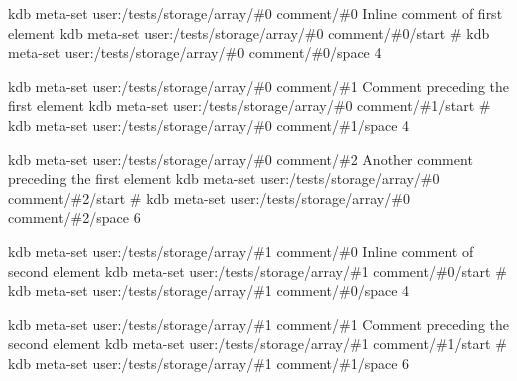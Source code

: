 kdb meta-\/set \textquotesingle{}user\+:/tests/storage/array/\#0\textquotesingle{} \textquotesingle{}comment/\#0\textquotesingle{} \textquotesingle{} Inline comment of first element\textquotesingle{} kdb meta-\/set \textquotesingle{}user\+:/tests/storage/array/\#0\textquotesingle{} \textquotesingle{}comment/\#0/start\textquotesingle{} \textquotesingle{}\#\textquotesingle{} kdb meta-\/set \textquotesingle{}user\+:/tests/storage/array/\#0\textquotesingle{} \textquotesingle{}comment/\#0/space\textquotesingle{} \textquotesingle{}4\textquotesingle{}

kdb meta-\/set \textquotesingle{}user\+:/tests/storage/array/\#0\textquotesingle{} \textquotesingle{}comment/\#1\textquotesingle{} \textquotesingle{} Comment preceding the first element\textquotesingle{} kdb meta-\/set \textquotesingle{}user\+:/tests/storage/array/\#0\textquotesingle{} \textquotesingle{}comment/\#1/start\textquotesingle{} \textquotesingle{}\#\textquotesingle{} kdb meta-\/set \textquotesingle{}user\+:/tests/storage/array/\#0\textquotesingle{} \textquotesingle{}comment/\#1/space\textquotesingle{} \textquotesingle{}4\textquotesingle{}

kdb meta-\/set \textquotesingle{}user\+:/tests/storage/array/\#0\textquotesingle{} \textquotesingle{}comment/\#2\textquotesingle{} \textquotesingle{} Another comment preceding the first element\textquotesingle{} kdb meta-\/set \textquotesingle{}user\+:/tests/storage/array/\#0\textquotesingle{} \textquotesingle{}comment/\#2/start\textquotesingle{} \textquotesingle{}\#\textquotesingle{} kdb meta-\/set \textquotesingle{}user\+:/tests/storage/array/\#0\textquotesingle{} \textquotesingle{}comment/\#2/space\textquotesingle{} \textquotesingle{}6\textquotesingle{}

kdb meta-\/set \textquotesingle{}user\+:/tests/storage/array/\#1\textquotesingle{} \textquotesingle{}comment/\#0\textquotesingle{} \textquotesingle{} Inline comment of second element\textquotesingle{} kdb meta-\/set \textquotesingle{}user\+:/tests/storage/array/\#1\textquotesingle{} \textquotesingle{}comment/\#0/start\textquotesingle{} \textquotesingle{}\#\textquotesingle{} kdb meta-\/set \textquotesingle{}user\+:/tests/storage/array/\#1\textquotesingle{} \textquotesingle{}comment/\#0/space\textquotesingle{} \textquotesingle{}4\textquotesingle{}

kdb meta-\/set \textquotesingle{}user\+:/tests/storage/array/\#1\textquotesingle{} \textquotesingle{}comment/\#1\textquotesingle{} \textquotesingle{} Comment preceding the second element\textquotesingle{} kdb meta-\/set \textquotesingle{}user\+:/tests/storage/array/\#1\textquotesingle{} \textquotesingle{}comment/\#1/start\textquotesingle{} \textquotesingle{}\#\textquotesingle{} kdb meta-\/set \textquotesingle{}user\+:/tests/storage/array/\#1\textquotesingle{} \textquotesingle{}comment/\#1/space\textquotesingle{} \textquotesingle{}6\textquotesingle{}


